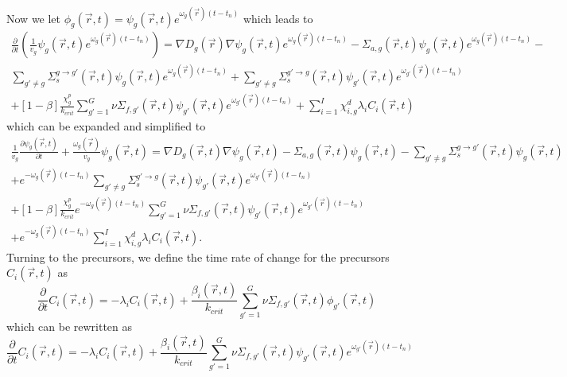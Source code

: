 \documentclass[12pt]{report}
\begin{document}
	Now we let $\phi_g(\vec{r},t) = \psi_g(\vec{r},t) e^{\omega_g(\vec{r}) (t-t_n)}$ which leads to
	\begin{eqnarray}
	\frac{\partial}{\partial t} \left( \frac{1}{v_g} \psi_g(\vec{r},t) e^{\omega_g(\vec{r}) (t-t_n)} \right) = \nabla D_g(\vec{r}) \nabla \psi_g(\vec{r},t) e^{\omega_g(\vec{r}) (t-t_n)}  - \Sigma_{a,g}(\vec{r},t) \psi_g(\vec{r},t) e^{\omega_g(\vec{r}) (t-t_n)} - \nonumber \\ \sum_{g'\neq g} \Sigma_{s}^{g\rightarrow g'} (\vec{r},t) \psi_g(\vec{r},t) e^{\omega_g(\vec{r}) (t-t_n)}    + \sum_{g' \neq g} \Sigma_{s}^{g'\rightarrow g} (\vec{r},t) \psi_{g'}(\vec{r},t) e^{\omega_{g'}(\vec{r}) (t-t_n)} \nonumber \\
	+ \left[ 1- \beta \right] \frac{\chi_g^p}{k_{crit}} \sum_{g'=1}^{G} \nu \Sigma_{f,g'}(\vec{r},t) \psi_{g'}(\vec{r},t) e^{\omega_{g'}(\vec{r}) (t-t_n)} + \sum_{i=1}^{I} \chi_{i,g}^d \lambda_i C_i(\vec{r},t) \nonumber
	\end{eqnarray}
	which can be expanded and simplified to
	\begin{eqnarray}
	\frac{1}{v_g} \frac{\partial \psi_g(\vec{r},t)}{\partial t} + \frac{\omega_g(\vec{r})}{v_g} \psi_g(\vec{r},t)  = \nabla D_g(\vec{r},t) \nabla \psi_g(\vec{r},t) - \Sigma_{a,g}(\vec{r},t) \psi_g(\vec{r},t) -  \sum_{g'\neq g} \Sigma_{s}^{g\rightarrow g'} (\vec{r},t) \psi_g(\vec{r},t) \nonumber \\ + e^{-\omega_g(\vec{r}) (t-t_n)} \sum_{g' \neq g} \Sigma_{s}^{g'\rightarrow g} (\vec{r},t) \psi_{g'}(\vec{r},t) e^{\omega_{g'}(\vec{r}) (t-t_n)} \nonumber \\
	+ \left[ 1- \beta \right] \frac{\chi_g^p}{k_{crit}} e^{-\omega_g(\vec{r}) (t-t_n)} \sum_{g'=1}^{G} \nu \Sigma_{f,g'}(\vec{r},t) \psi_{g'}(\vec{r},t) e^{\omega_{g'}(\vec{r}) (t-t_n)} \nonumber \\ + e^{-\omega_g(\vec{r}) (t-t_n)} \sum_{i=1}^{I} \chi_{i,g}^d \lambda_i C_i(\vec{r},t) \nonumber.
	\end{eqnarray}
	Turning to the precursors, we define the time rate of change for the precursors $C_i(\vec{r},t)$ as
	\begin{equation}
	\frac{\partial}{\partial t} C_i(\vec{r},t) = -\lambda_i C_i(\vec{r},t) + \frac{\beta_i(\vec{r},t)}{k_{crit}} \sum_{g'=1}^{G} \nu \Sigma_{f,g'}(\vec{r},t) \phi_{g'}(\vec{r},t) \nonumber
	\end{equation}
	which can be rewritten as
	\begin{equation}
	\frac{\partial}{\partial t} C_i(\vec{r},t) = -\lambda_i C_i(\vec{r},t) + \frac{\beta_i(\vec{r},t)}{k_{crit}} \sum_{g'=1}^{G} \nu \Sigma_{f,g'}(\vec{r},t) \psi_{g'}(\vec{r},t) e^{\omega_{g'}(\vec{r}) (t-t_n)} \nonumber
	\end{equation}
\end{document}
